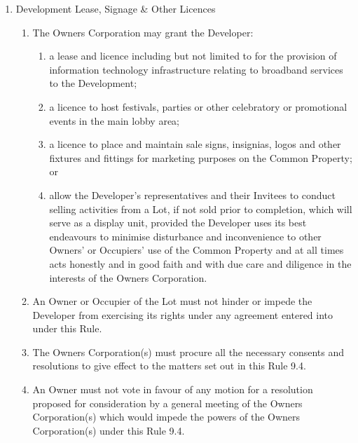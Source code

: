 \documentclass{article}
\begin{document}
\begin{enumerate}[label=\arabic*.]
\begin{enumerate}[label=\arabic{enumi}.\arabic*.]
\begin{enumerate}[label=\arabic{enumi}.\arabic*.]
\begin{enumerate}[label=(\arabic*)]
\end{enumerate}

\item  Development Lease, Signage \& Other Licences

\begin{enumerate}[label=(\arabic*)]

\item  The Owners Corporation may grant the Developer:

\begin{enumerate}[label=(\alph*)]

\item  a lease and licence including but not limited to for the provision of information technology infrastructure relating to broadband services to the Development;

\item  a licence to host festivals, parties or other celebratory or promotional events in the main lobby area;

\item  a licence to place and maintain sale signs, insignias, logos and other fixtures and fittings for marketing purposes on the Common Property; or
\newpage



\item  allow the Developer's representatives and their Invitees to conduct selling activities from a Lot, if not sold prior to completion, which will serve as a display unit, provided the Developer uses its best endeavours to minimise disturbance and inconvenience to other Owners' or Occupiers' use of the Common Property and at all times acts honestly and in good faith and with due care and diligence in the interests of the Owners Corporation.

\end{enumerate}

\item  An Owner or Occupier of the Lot must not hinder or impede the Developer from exercising its rights under any agreement entered into under this Rule.

\item  The Owners Corporation(s) must procure all the necessary consents and resolutions to give effect to the matters set out in this Rule 9.4.

\item  An Owner must not vote in favour of any motion for a resolution proposed for consideration by a general meeting of the Owners Corporation(s) which would impede the powers of the Owners Corporation(s) under this Rule 9.4.


\end{enumerate}
\end{enumerate}
\end{enumerate}
\end{enumerate}
\end{document}
